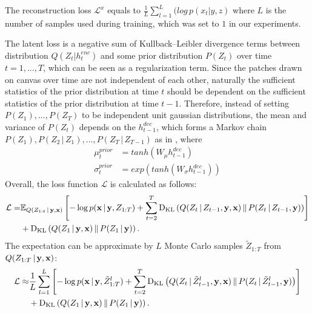 \documentclass{article} %
\newcommand{\comm}[1]{}
\newcommand{\given}{\,|\,}
\newcommand{\expectation}{\mathbb{E}}
\newcommand{\kldiv}{\mathrm{D}_{\rm KL}}
\newcommand{\klBars}{\,\|\,}
\newcommand{\hdec}{h^{dec}}
\newcommand{\henc}{h^{enc}}
\newcommand{\Lat}{Z}
\newcommand{\numSamples}{L}
\newcommand{\sampleIdx}{l}
\newcommand{\LatSample}{\tilde{Z}}
\newcommand{\icaption}{{\bf{y}}}
\newcommand{\oimage}{{\bf{x}}}
\newcommand{\post}{Q}
\newcommand{\prior}{P}
\newcommand{\loss}{\mathcal{L}}
\newcommand{\rloss}{\mathcal{L}^{x}}
\begin{document}
The reconstruction loss $\rloss$ equals to $\frac{1}{L}\sum_{l=1}^{L}(log\,p(x_{t}|y,z)$ where $L$ is the number of samples used during training, which was set to $1$ in our experiments.

The latent loss is a negative sum of Kullback--Leibler divergence terms between distribution $\post(\Lat_t|\henc_t)$ and some prior distribution ${\prior(\Lat_t)}$ over time $t=1,...,T$, which can be seen as a regularization term. Since the patches drawn on canvas over time are not independent of each other, naturally the sufficient statistics of the prior distribution at time $t$ should be dependent on the sufficient statistics of the prior distribution at time $t-1$. Therefore, instead of setting $\prior(\Lat_1), ..., \prior(\Lat_T)$ to be independent unit gaussian distributions, the mean and variance of $\prior(\Lat_t)$ depends on the $\hdec_{t-1}$, which forms a Markov chain $\prior(\Lat_1), \prior(\Lat_2\given\Lat_1), ..., \prior(\Lat_T\given\Lat_{T-1})$ as in \citep{bachman_sdm}, where 
\begin{align}
\mu_{t}^{prior} &= tanh(W_{\mu}\hdec_{t-1})\\
\sigma_{t}^{prior} &= exp(tanh(W_{\sigma}\hdec_{t-1})) 
\end{align}
Overall, the loss function $\loss$ is calculated as follows:
\begin{align}
\loss =  &\expectation_{Q(\Lat_{1:t}\given\icaption,\oimage)}\left[ - \log p(\oimage\given\icaption,\Lat_{1:T}) + \sum_{t=2}^T\kldiv\left(\post(\Lat_t\given\Lat_{t-1},\icaption,\oimage)\klBars\prior(\Lat_t\given\Lat_{t-1},\icaption)\right) \right] \nonumber \\& + \kldiv\left(\post(\Lat_1\given\icaption,\oimage)\klBars\prior(\Lat_1\given\icaption)\right).
\end{align}
The expectation can be approximate by $\numSamples$ Monte Carlo samples $\LatSample_{1:T}$ from $\post(\Lat_{1:T}\given\icaption, \oimage)$:
\begin{align}
\loss \approx  &\frac{1}{\numSamples}\sum_{\sampleIdx=1}^\numSamples\left[ - \log p(\oimage\given\icaption,\LatSample^\sampleIdx_{1:T}) + \sum_{t=2}^T\kldiv\left(\post(\Lat_t\given\LatSample^\sampleIdx_{t-1},\icaption,\oimage)\klBars\prior(\Lat_t\given\LatSample^\sampleIdx_{t-1},\icaption)\right) \right] \nonumber \\& + \kldiv\left(\post(\Lat_1\given\icaption,\oimage)\klBars\prior(\Lat_1\given\icaption)\right).
\end{align}
\comm{
\begin{align}
\loss &= -\sum_{t=1}^{T}D_{KL}(\post(\Lat_t|\henc_t,s_{t-1})\,||\,\prior(\Lat_t)) + \frac{1}{L}\sum_{l=1}^{L}log\,p(x_{t}|y,z)\\
&=
\frac{1}{2}\sum_{t=1}^{T}(1 - 2\,log\,\sigma_{t}^{prior} + 2\,log\,\sigma_{t} - \frac{exp(2\,log\,\sigma_{t}) + (\mu_{t} - \mu_{t}^{prior})^{2}}{exp(2\,log\,\sigma_{t}^{prior})}) + \frac{1}{L}\sum_{l=1}^{L}log\,p(x_{t}|y,z)
\end{align}
}
\end{document}
